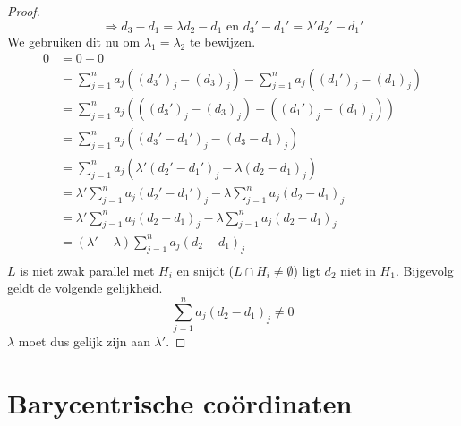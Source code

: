 \documentclass[main.tex]{subfiles}
\begin{document}
\begin{st}
\begin{proof}
    \[ \Rightarrow d_{3}-d_{1} = \lambda {d_{2}-d_{1}} \text{ en } d_{3}'-d_{1}' = \lambda' d_{2}'-d_{1}' \]
    We gebruiken dit nu om $\lambda_{1} = \lambda_{2}$ te bewijzen.
    \[
    \begin{array}{rl}
      0 &= 0 - 0\\
        &= \sum_{j=1}^{n}a_{j}((d_{3}')_{j}-(d_{3})_{j}) - \sum_{j=1}^{n}a_{j}((d_{1}')_{j}-(d_{1})_{j}) \\
        &= \sum_{j=1}^{n}a_{j}(((d_{3}')_{j}-(d_{3})_{j}) - ((d_{1}')_{j}-(d_{1})_{j})) \\
        &= \sum_{j=1}^{n}a_{j}((d_{3}' - d_{1}')_{j} - (d_{3} -d_{1})_{j}) \\
        &= \sum_{j=1}^{n}a_{j}(\lambda'(d_{2}' - d_{1}')_{j} - \lambda(d_{2} -d_{1})_{j}) \\
        &= \lambda'\sum_{j=1}^{n}a_{j}(d_{2}' - d_{1}')_{j} - \lambda\sum_{j=1}^{n}a_{j}(d_{2} -d_{1})_{j} \\
        &= \lambda'\sum_{j=1}^{n}a_{j}(d_{2} - d_{1})_{j} - \lambda\sum_{j=1}^{n}a_{j}(d_{2} -d_{1})_{j} \\
        &= (\lambda' -\lambda)\sum_{j=1}^{n}a_{j}(d_{2} -d_{1})_{j} \\
    \end{array}
    \]
    $L$ is niet zwak parallel met $H_{i}$ en snijdt ($L \cap H_{i} \neq \emptyset$) ligt $d_{2}$ niet in $H_{1}$.
    Bijgevolg geldt de volgende gelijkheid.
    \[ \sum_{j=1}^{n}a_{j}(d_{2} -d_{1})_{j} \neq 0 \]
    $\lambda$ moet dus gelijk zijn aan $\lambda'$.
  \end{proof}
\end{st}

\section{Barycentrische co\"ordinaten}
\label{sec:baryc-coordinaten}
\end{document}
